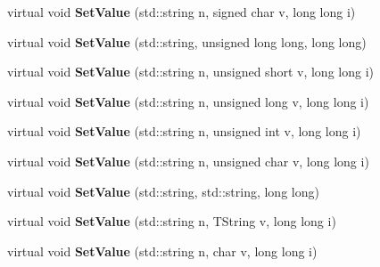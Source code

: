\begin{DoxyCompactItemize}
\item 
\hypertarget{class_h_a_l_1_1_analysis_data_a22ef315bf9126cc2764c245177b56a4f}{virtual void {\bfseries Set\-Value} (std\-::string n, signed char v, long long i)}\label{class_h_a_l_1_1_analysis_data_a22ef315bf9126cc2764c245177b56a4f}

\item 
\hypertarget{class_h_a_l_1_1_analysis_data_ae895390f989f61291c363c8964a1d96f}{virtual void {\bfseries Set\-Value} (std\-::string, unsigned long long, long long)}\label{class_h_a_l_1_1_analysis_data_ae895390f989f61291c363c8964a1d96f}

\item 
\hypertarget{class_h_a_l_1_1_analysis_data_a50badb25311846cb656bebd3a1507358}{virtual void {\bfseries Set\-Value} (std\-::string n, unsigned short v, long long i)}\label{class_h_a_l_1_1_analysis_data_a50badb25311846cb656bebd3a1507358}

\item 
\hypertarget{class_h_a_l_1_1_analysis_data_a174af9c31f3c7eb4af56e2f841fb4055}{virtual void {\bfseries Set\-Value} (std\-::string n, unsigned long v, long long i)}\label{class_h_a_l_1_1_analysis_data_a174af9c31f3c7eb4af56e2f841fb4055}

\item 
\hypertarget{class_h_a_l_1_1_analysis_data_acd3994b8d906fac0180a00bd961246e6}{virtual void {\bfseries Set\-Value} (std\-::string n, unsigned int v, long long i)}\label{class_h_a_l_1_1_analysis_data_acd3994b8d906fac0180a00bd961246e6}

\item 
\hypertarget{class_h_a_l_1_1_analysis_data_a7bb9137a1b9e91f2bf0856bf5c42b484}{virtual void {\bfseries Set\-Value} (std\-::string n, unsigned char v, long long i)}\label{class_h_a_l_1_1_analysis_data_a7bb9137a1b9e91f2bf0856bf5c42b484}

\item 
\hypertarget{class_h_a_l_1_1_analysis_data_ae6a0c32c32b12f93ae2fd86f35982eb8}{virtual void {\bfseries Set\-Value} (std\-::string, std\-::string, long long)}\label{class_h_a_l_1_1_analysis_data_ae6a0c32c32b12f93ae2fd86f35982eb8}

\item 
\hypertarget{class_h_a_l_1_1_analysis_data_a138a62bce8c578f983bc8ea3da86509f}{virtual void {\bfseries Set\-Value} (std\-::string n, T\-String v, long long i)}\label{class_h_a_l_1_1_analysis_data_a138a62bce8c578f983bc8ea3da86509f}

\item 
\hypertarget{class_h_a_l_1_1_analysis_data_a3f60ce2e4e013d362e3c159bacb83b78}{virtual void {\bfseries Set\-Value} (std\-::string n, char v, long long i)}\label{class_h_a_l_1_1_analysis_data_a3f60ce2e4e013d362e3c159bacb83b78}


\end{DoxyCompactItemize}
